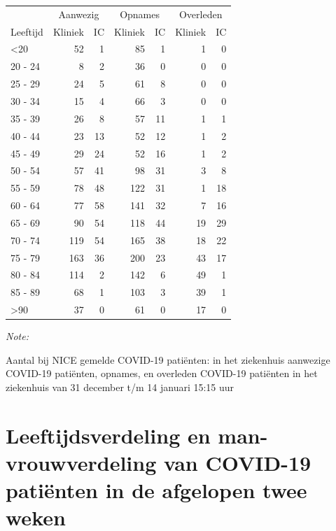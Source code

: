 \documentclass[
  english,
  man,floatsintext]{apa6}
\begin{document}
\begin{table}
\centering\begingroup\fontsize{10}{12}\selectfont

\begin{threeparttable}
\begin{tabular}{lrrrrrr}
\toprule
\multicolumn{1}{c}{ } & \multicolumn{2}{c}{Aanwezig} & \multicolumn{2}{c}{Opnames} & \multicolumn{2}{c}{Overleden} \\
\cmidrule(l{3pt}r{3pt}){2-3} \cmidrule(l{3pt}r{3pt}){4-5} \cmidrule(l{3pt}r{3pt}){6-7}
Leeftijd & Kliniek & IC & Kliniek & IC & Kliniek & IC\\
\midrule
<20 & 52 & 1 & 85 & 1 & 1 & 0\\
20 - 24 & 8 & 2 & 36 & 0 & 0 & 0\\
25 - 29 & 24 & 5 & 61 & 8 & 0 & 0\\
30 - 34 & 15 & 4 & 66 & 3 & 0 & 0\\
35 - 39 & 26 & 8 & 57 & 11 & 1 & 1\\
40 - 44 & 23 & 13 & 52 & 12 & 1 & 2\\
45 - 49 & 29 & 24 & 52 & 16 & 1 & 2\\
50 - 54 & 57 & 41 & 98 & 31 & 3 & 8\\
55 - 59 & 78 & 48 & 122 & 31 & 1 & 18\\
60 - 64 & 77 & 58 & 141 & 32 & 7 & 16\\
65 - 69 & 90 & 54 & 118 & 44 & 19 & 29\\
70 - 74 & 119 & 54 & 165 & 38 & 18 & 22\\
75 - 79 & 163 & 36 & 200 & 23 & 43 & 17\\
80 - 84 & 114 & 2 & 142 & 6 & 49 & 1\\
85 - 89 & 68 & 1 & 103 & 3 & 39 & 1\\
>90 & 37 & 0 & 61 & 0 & 17 & 0\\
\bottomrule
\end{tabular}
\begin{tablenotes}
\item \textit{Note: } 
\item Aantal bij NICE gemelde COVID-19 patiënten: in het ziekenhuis aanwezige COVID-19 patiënten, opnames, en overleden COVID-19 patiënten in het ziekenhuis van 31 december t/m 14 januari 15:15 uur
\end{tablenotes}
\end{threeparttable}
\endgroup{}
\end{table}

\newpage

\hypertarget{leeftijdsverdeling-en-man-vrouwverdeling-van-covid-19-patiuxebnten-in-de-afgelopen-twee-weken}{%
\section{Leeftijdsverdeling en man-vrouwverdeling van COVID-19 patiënten in de afgelopen twee weken}\label{leeftijdsverdeling-en-man-vrouwverdeling-van-covid-19-patiuxebnten-in-de-afgelopen-twee-weken}}
\end{document}
